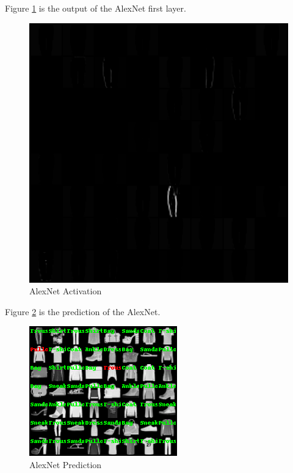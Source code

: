 \documentclass{../../Latex_Template/Homework/homework}
\begin{document}
\begin{arabicparts}
    Figure \ref{fig:alexnet_activation} is the output of the AlexNet first layer.
    \begin{figure}[H]
      \begin{center}
        \includegraphics[width=0.5\linewidth]{Alexnet_activation.png}
        \caption{AlexNet Activation}
        \label{fig:alexnet_activation}
      \end{center}
    \end{figure}

    \questionpart
    Figure \ref{fig:alexnet_prediction} is the prediction of the AlexNet.
    \begin{figure}[H]
      \begin{center}
        \includegraphics[width=0.5\linewidth]{Alexnet_predict.png}
        \caption{AlexNet Prediction}
        \label{fig:alexnet_prediction}
      \end{center}
    \end{figure}

  \end{arabicparts}
\end{document}
